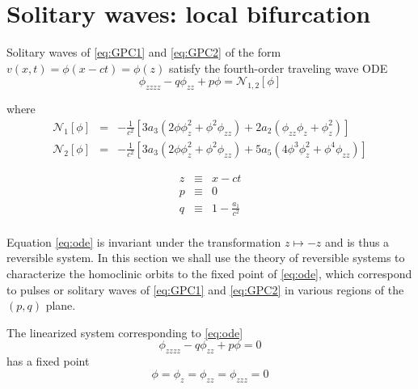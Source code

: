 \section{Solitary waves: local bifurcation}

Solitary waves of \eqref{eq:GPC1} and \eqref{eq:GPC2} of the form 
$v(x,t) = \phi\left(x - c t\right) = \phi\left(z\right)$
 satisfy the fourth-order traveling wave ODE
\begin{equation} \label{eq:ode} \phi_{zzzz} - q \phi_{zz} + p \phi = \mathcal{N}_{1,2}[\phi]
\end{equation}

where 
\begin{subequations}
\begin{eqnarray}
\mathcal{N}_1\left[\phi\right] &=& - \frac{1}{c^2}\left[  3 a_3 \left( 2 \phi \phi_z^2 + \phi^2 \phi_{zz} \right) + 2 a_2\left( \phi_{zz} \phi_z + \phi_z^2\right) \right] \\
\mathcal{N}_2\left[\phi\right] &=& - \frac{1}{c^2}\left[ 3 a_3 \left( 2 \phi \phi_z^2 + \phi^2 \phi_{zz}\right) + 5 a_5 \left( 4 \phi^3 \phi_z^2 + \phi^4 \phi_{zz} \right) \right]
\end{eqnarray}
\end{subequations}

\begin{subequations}
\begin{eqnarray}
z &\equiv& x - c t\\
p &\equiv& 0\label{eq:pdef} \\
q &\equiv & 1 - \frac{a_1}{c^2} \label{eq:qdef} \\
\end{eqnarray}
\end{subequations}

Equation \eqref{eq:ode} is invariant under the transformation $ z \mapsto -z $ and is thus a reversible system. In this section we shall
use the theory of reversible systems to characterize the homoclinic orbits to the fixed point of \eqref{eq:ode}, which correspond to pulses
or solitary waves of \eqref{eq:GPC1} and \eqref{eq:GPC2} in various regions of the $(p,q)$ plane.

The linearized system corresponding to \eqref{eq:ode}
\begin{equation}
 \label{eq:linode} \phi_{zzzz} - q \phi_{zz} + p \phi = 0
\end{equation}
has a fixed point \begin{equation}\label{eq:fp} \phi = \phi_z = \phi_{zz} = \phi_{zzz} = 0 \end{equation}


